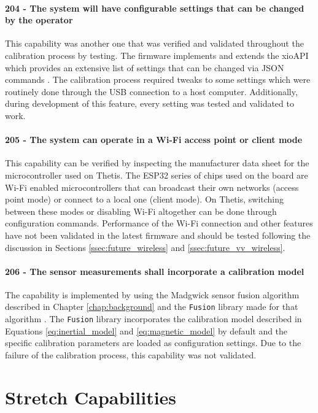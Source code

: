 \paragraph*{204 - The system will have configurable settings that can be changed by the operator} This capability was another one that was verified and validated throughout the calibration process by testing.
The firmware implements and extends the xioAPI which provides an extensive list of settings that can be changed via JSON commands \cite{ThetisUserManual}.
The calibration process required tweaks to some settings which were routinely done through the USB connection to a host computer.
Additionally, during development of this feature, every setting was tested and validated to work.

\paragraph*{205 - The system can operate in a Wi-Fi access point or client mode} This capability can be verified by inspecting the manufacturer data sheet for the microcontroller used on Thetis.
The ESP32 series of chips used on the board are Wi-Fi enabled microcontrollers that can broadcast their own networks (access point mode) or connect to a local one (client mode).
On Thetis, switching between these modes or disabling Wi-Fi altogether can be done through configuration commands.
Performance of the Wi-Fi connection and other features have not been validated in the latest firmware and should be tested following the discussion in Sections \ref{ssec:future_wireless} and \ref{ssec:future_vv_wireless}.

\paragraph*{206 - The sensor measurements shall incorporate a calibration model} The capability is implemented by using the Madgwick sensor fusion algorithm described in Chapter \ref{chap:background} and the \lstinline[style=customInline]|Fusion| library made for that algorithm \cite{Fusion-Arduino}.
The \lstinline[style=customInline]|Fusion| library incorporates the calibration model described in Equations \ref{eq:inertial_model} and \ref{eq:magnetic_model} by default and the specific calibration parameters are loaded as configuration settings.
Due to the failure of the calibration process, this capability was not validated.

\section{Stretch Capabilities}

